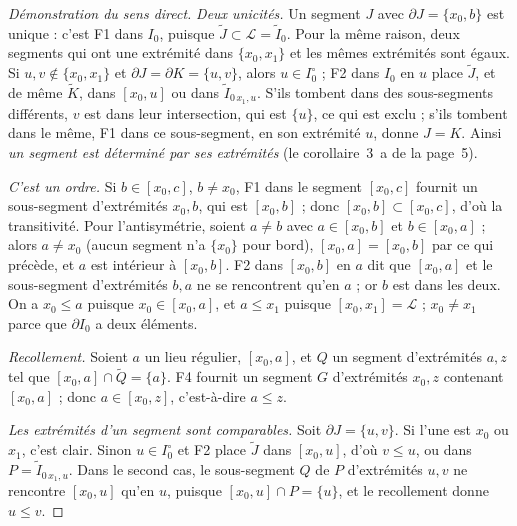 \begin{proof}[Démonstration du sens direct]
\emph{Deux unicités.} Un segment $J$ avec $\partial J = \{x_0, b\}$ est unique : c'est F1 dans $I_0$, puisque $\widetilde J \subset \mathcal L = \widetilde I_0$. Pour la même raison, deux segments qui ont une extrémité dans $\{x_0, x_1\}$ et les mêmes extrémités sont égaux. Si $u, v \notin \{x_0, x_1\}$ et $\partial J = \partial K = \{u,v\}$, alors $u \in I_0^\circ$ ; F2 dans $I_0$ en $u$ place $\widetilde J$, et de même $\widetilde K$, dans $[x_0, u]$ ou dans $\widetilde I_{0\,x_1,u}$. S'ils tombent dans des sous-segments différents, $v$ est dans leur intersection, qui est $\{u\}$, ce qui est exclu ; s'ils tombent dans le même, F1 dans ce sous-segment, en son extrémité $u$, donne $J = K$. Ainsi \emph{un segment est déterminé par ses extrémités} (le corollaire~3~a de la page~5).

\emph{C'est un ordre.} Si $b \in [x_0, c]$, $b \neq x_0$, F1 dans le segment $[x_0,c]$ fournit un sous-segment d'extrémités $x_0, b$, qui est $[x_0,b]$ ; donc $[x_0, b] \subset [x_0, c]$, d'où la transitivité. Pour l'antisymétrie, soient $a \neq b$ avec $a \in [x_0,b]$ et $b \in [x_0,a]$ ; alors $a \neq x_0$ (aucun segment n'a $\{x_0\}$ pour bord), $[x_0,a] = [x_0,b]$ par ce qui précède, et $a$ est intérieur à $[x_0,b]$. F2 dans $[x_0,b]$ en $a$ dit que $[x_0,a]$ et le sous-segment d'extrémités $b, a$ ne se rencontrent qu'en $a$ ; or $b$ est dans les deux. On a $x_0 \leq a$ puisque $x_0 \in [x_0,a]$, et $a \leq x_1$ puisque $[x_0,x_1] = \mathcal L$ ; $x_0 \neq x_1$ parce que $\partial I_0$ a deux éléments.

\emph{Recollement.} Soient $a$ un lieu régulier, $[x_0,a]$, et $Q$ un segment d'extrémités $a, z$ tel que $[x_0, a] \cap \widetilde Q = \{a\}$. F4 fournit un segment $G$ d'extrémités $x_0, z$ contenant $[x_0,a]$ ; donc $a \in [x_0, z]$, c'est-à-dire $a \leq z$.

\emph{Les extrémités d'un segment sont comparables.} Soit $\partial J = \{u,v\}$. Si l'une est $x_0$ ou $x_1$, c'est clair. Sinon $u \in I_0^\circ$ et F2 place $\widetilde J$ dans $[x_0,u]$, d'où $v \leq u$, ou dans $P = \widetilde I_{0\,x_1,u}$. Dans le second cas, le sous-segment $Q$ de $P$ d'extrémités $u, v$ ne rencontre $[x_0,u]$ qu'en $u$, puisque $[x_0,u] \cap P = \{u\}$, et le recollement donne $u \leq v$.


\end{proof}
